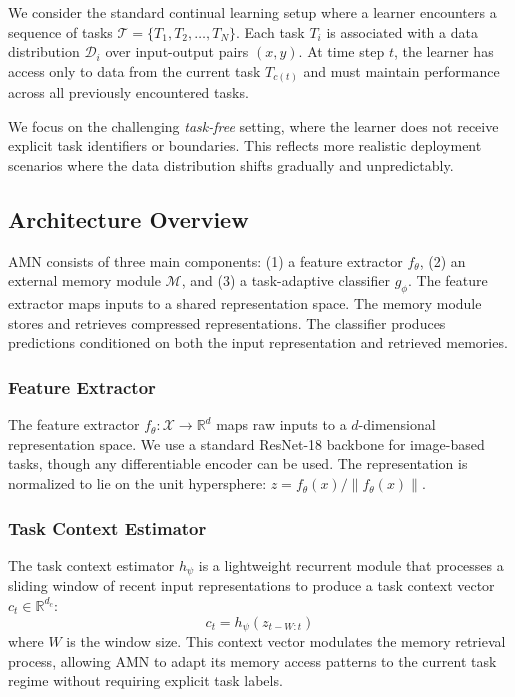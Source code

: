 \documentclass[11pt]{article}
\begin{document}
We consider the standard continual learning setup where a learner encounters a sequence of tasks $\mathcal{T} = \{T_1, T_2, \ldots, T_N\}$. Each task $T_i$ is associated with a data distribution $\mathcal{D}_i$ over input-output pairs $(x, y)$. At time step $t$, the learner has access only to data from the current task $T_{c(t)}$ and must maintain performance across all previously encountered tasks.

We focus on the challenging \emph{task-free} setting, where the learner does not receive explicit task identifiers or boundaries. This reflects more realistic deployment scenarios where the data distribution shifts gradually and unpredictably.

\subsection{Architecture Overview}

AMN consists of three main components: (1) a feature extractor $f_\theta$, (2) an external memory module $\mathcal{M}$, and (3) a task-adaptive classifier $g_\phi$. The feature extractor maps inputs to a shared representation space. The memory module stores and retrieves compressed representations. The classifier produces predictions conditioned on both the input representation and retrieved memories.

\subsubsection{Feature Extractor}

The feature extractor $f_\theta: \mathcal{X} \rightarrow \mathbb{R}^d$ maps raw inputs to a $d$-dimensional representation space. We use a standard ResNet-18 backbone \citep{he2016deep} for image-based tasks, though any differentiable encoder can be used. The representation is normalized to lie on the unit hypersphere: $z = f_\theta(x) / \|f_\theta(x)\|$.

\subsubsection{Task Context Estimator}

The task context estimator $h_\psi$ is a lightweight recurrent module that processes a sliding window of recent input representations to produce a task context vector $c_t \in \mathbb{R}^{d_c}$:
\begin{equation}
    c_t = h_\psi(z_{t-W:t})
\end{equation}
where $W$ is the window size. This context vector modulates the memory retrieval process, allowing AMN to adapt its memory access patterns to the current task regime without requiring explicit task labels.
\end{document}
